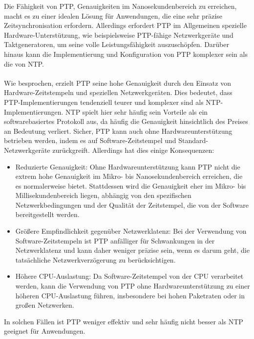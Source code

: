 Die Fähigkeit von PTP, Genauigkeiten im Nanosekundenbereich zu erreichen, macht es zu einer idealen Lösung für Anwendungen, die eine sehr präzise Zeitsynchronisation erfordern. Allerdings erfordert PTP im Allgemeinen spezielle Hardware-Unterstützung, wie beispielsweise PTP-fähige Netzwerkgeräte und Taktgeneratoren, um seine volle Leistungsfähigkeit auszuschöpfen. Darüber hinaus kann die Implementierung und Konfiguration von PTP komplexer sein als die von NTP.
\\\\
Wie besprochen, erzielt PTP seine hohe Genauigkeit durch den Einsatz von Hardware-Zeitstempeln und speziellen Netzwerkgeräten. Dies bedeutet, dass PTP-Implementierungen tendenziell teurer und komplexer sind als NTP-Implementierungen. NTP spielt hier sehr häufig sein Vorteile als ein softwarebasiertes Protokoll aus, da häufig die Genauigkeit hinsichtlich des Preises an Bedeutung verliert.
Sicher, PTP kann auch ohne Hardwareunterstützung betrieben werden, indem es auf Software-Zeitstempel und Standard-Netzwerkgeräte zurückgreift. Allerdings hat dies einige Konsequenzen:
\begin{itemize}
\item Reduzierte Genauigkeit: Ohne Hardwareunterstützung kann PTP nicht die extrem hohe Genauigkeit im Mikro- bis Nanosekundenbereich erreichen, die es normalerweise bietet. Stattdessen wird die Genauigkeit eher im Mikro- bis Millisekundenbereich liegen, abhängig von den spezifischen Netzwerkbedingungen und der Qualität der Zeitstempel, die von der Software bereitgestellt werden.
\item Größere Empfindlichkeit gegenüber Netzwerklatenz: Bei der Verwendung von Software-Zeitstempeln ist PTP anfälliger für Schwankungen in der Netzwerklatenz und kann daher weniger präzise sein, wenn es darum geht, die tatsächliche Netzwerkverzögerung zu berücksichtigen.
\item Höhere CPU-Auslastung: Da Software-Zeitstempel von der CPU verarbeitet werden, kann die Verwendung von PTP ohne Hardwareunterstützung zu einer höheren CPU-Auslastung führen, insbesondere bei hohen Paketraten oder in großen Netzwerken.
\end{itemize}
In solchen Fällen ist PTP weniger effektiv und sehr häufig nicht besser als NTP geeignet für Anwendungen.

